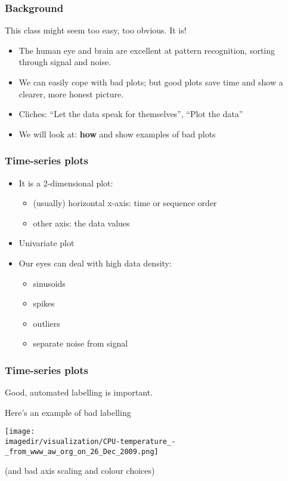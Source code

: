 \begin{frame}\frametitle{Background}
	
	This class might seem too easy, too obvious. It is!
	\begin{itemize}
		\item	The human eye and brain are excellent at pattern recognition, sorting through signal and noise. \pause 
		\item	We can easily cope with bad plots; but good plots save time and show a clearer, more honest picture. 
		\item	Cliches: ``Let the data speak for themselves'', ``Plot the data'' 
		\item	We will look at: \textbf{how} and show examples of bad plots
	\end{itemize}
\end{frame}

\begin{frame}\frametitle{Time-series plots}
	\begin{itemize}
		\item	It is a 2-dimensional plot: 
		\begin{itemize}
			\item	(usually) horizontal x-axis: time or sequence order 
			\item	other axis: the data values 
		\end{itemize}
		\item	Univariate plot 
	\end{itemize}
	\begin{itemize}
		\item	Our eyes can deal with high data density: 
		\begin{itemize}
			\item	sinusoids 
			\item	spikes 
			\item	outliers 
			\item	separate noise from signal 
		\end{itemize}
	\end{itemize}
\end{frame}

\begin{frame}\frametitle{Time-series plots}
	
	Good, automated labelling is important.
	
	Here's an example of bad labelling
	\begin{center}
		\texttt{[image: \\imagedir/visualization/CPU-temperature\_-\_from\_www\_aw\_org\_on\_26\_Dec\_2009.png]}
	\end{center}
	(and bad axis scaling and colour choices)
\end{frame}

